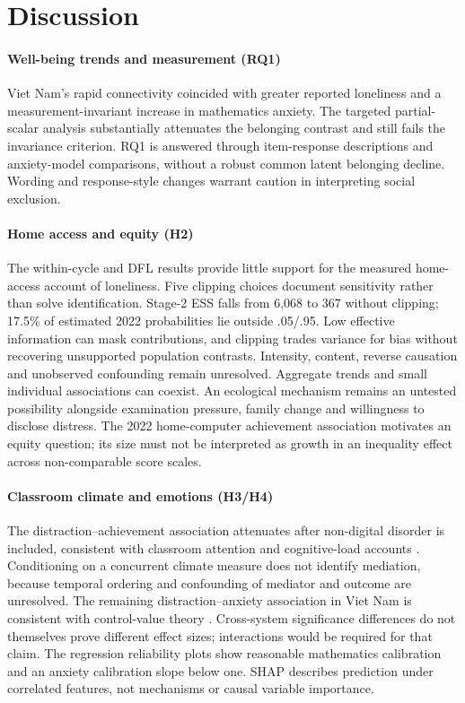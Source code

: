 \documentclass[preprint,12pt,authoryear,nonatbib]{elsarticle}
\let\citep\parencite
\begin{document}
\section{Discussion}

\paragraph{Well-being trends and measurement (RQ1)} Viet Nam's rapid connectivity coincided with greater reported loneliness and a measurement-invariant increase in mathematics anxiety. The targeted partial-scalar analysis substantially attenuates the belonging contrast and still fails the invariance criterion. RQ1 is answered through item-response descriptions and anxiety-model comparisons, without a robust common latent belonging decline. Wording and response-style changes warrant caution in interpreting social exclusion.

\paragraph{Home access and equity (H2)} The within-cycle and DFL results provide little support for the measured home-access account of loneliness. Five clipping choices document sensitivity rather than solve identification. Stage-2 ESS falls from 6,068 to 367 without clipping; 17.5\% of estimated 2022 probabilities lie outside .05/.95. Low effective information can mask contributions, and clipping trades variance for bias without recovering unsupported population contrasts. Intensity, content, reverse causation and unobserved confounding remain unresolved. Aggregate trends \citep{twenge2021,twenge2025} and small individual associations \citep{orben2019,vuorre2021} can coexist. An ecological mechanism remains an untested possibility alongside examination pressure, family change and willingness to disclose distress. The 2022 home-computer achievement association motivates an equity question; its size must not be interpreted as growth in an inequality effect across non-comparable score scales.

\paragraph{Classroom climate and emotions (H3/H4)} The distraction--achievement association attenuates after non-digital disorder is included, consistent with classroom attention and cognitive-load accounts \citep{sweller1988}. Conditioning on a concurrent climate measure does not identify mediation, because temporal ordering and confounding of mediator and outcome are unresolved. The remaining distraction--anxiety association in Viet Nam is consistent with control-value theory \citep{pekrun2006}. Cross-system significance differences do not themselves prove different effect sizes; interactions would be required for that claim. The regression reliability plots show reasonable mathematics calibration and an anxiety calibration slope below one. SHAP describes prediction under correlated features, not mechanisms or causal variable importance.
\end{document}
